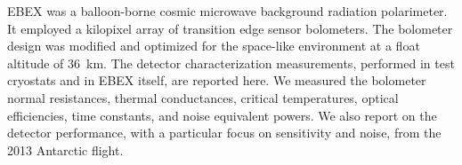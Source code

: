 
EBEX was a balloon-borne cosmic microwave background radiation polarimeter. 
It employed a kilopixel array of transition edge sensor bolometers. 
The bolometer design was modified and optimized for the space-like environment at a float altitude of 36~km. 
The detector characterization measurements, performed in test cryostats and in EBEX itself, are reported here. 
We measured the bolometer normal resistances, thermal conductances, critical temperatures, optical efficiencies, time constants, and noise equivalent powers. 
We also report on the detector performance, with a particular focus on sensitivity and noise, from the 2013 Antarctic flight.



